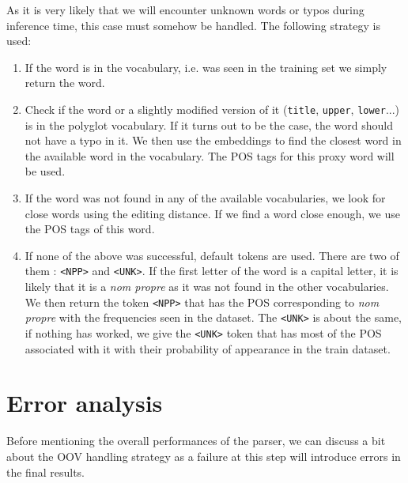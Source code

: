 \documentclass{article}
\begin{document}
As it is very likely that we will encounter unknown words or typos during
inference time, this case must somehow be handled. The following strategy is
used:
\begin{enumerate}
\item If the word is in the vocabulary, i.e. was seen in the training set we
  simply return the word.
\item Check if the word or a slightly modified version of it (\texttt{title},
  \texttt{upper}, \texttt{lower}...) is in the polyglot vocabulary. If it turns
  out to be the case, the word should not have a typo in it. We then use the
  embeddings to find the closest word in the available word in the vocabulary.
  The POS tags for this proxy word will be used.
\item If the word was not found in any of the available vocabularies, we look
  for close words using the editing distance. If we find a word close enough, we
  use the POS tags of this word.
\item If none of the above was successful, default tokens are used. There are
  two of them : \texttt{<NPP>} and \texttt{<UNK>}. If the first letter of the
  word is a capital letter, it is likely that it is a \textit{nom propre} as it
  was not found in the other vocabularies. We then return the token
  \texttt{<NPP>} that has the POS corresponding to \textit{nom propre} with the
  frequencies seen in the dataset. The \texttt{<UNK>} is about the same, if
  nothing has worked, we give the \texttt{<UNK>} token that has most of the POS
  associated with it with their probability of appearance in the train dataset.
\end{enumerate}


\section{Error analysis}

Before mentioning the overall performances of the parser, we can discuss a bit
about the OOV handling strategy as a failure at this step will introduce errors
in the final results.\\
\end{document}
